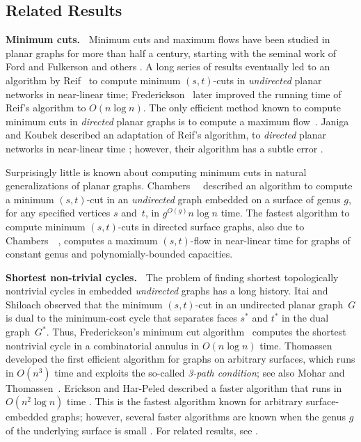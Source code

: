 \documentclass[twoside,leqno,twocolumn]{article}
\def\fakeparagraph#1{\par\medskip\noindent\textbf{#1}}
\begin{document}
\subsection{Related Results}

\textbf{Minimum cuts.~}
Minimum cuts and maximum flows have been studied in planar graphs for more than half a century, starting with the seminal work of Ford and Fulkerson \cite{ff-mfn-56} and others \cite{hr-fmern-55}.  A long series of results eventually led to an algorithm by Reif~\cite{r-mstcp-83} to compute minimum $(s,t)$-cuts in \emph{undirected} planar networks in near-linear time; Frederickson~\cite{f-faspp-87} later improved the running time of Reif's algorithm to $O(n\log n)$.  The only efficient method known to compute minimum cuts in \emph{directed} planar graphs is to compute a maximum flow~\cite{w-mstfp-97, bk-amfdp-09, parshort}.  Janiga and Koubek described an adaptation of Reif's algorithm, to \emph{directed} planar networks in near-linear time \cite{jk-mcdpn-92}; however, their algorithm has a subtle error \cite{n-pc-10}.

Surprisingly little is known about computing minimum cuts in natural generalizations of planar graphs.  Chambers~\etal~\cite{surfcut} described an algorithm to compute a minimum $(s,t)$-cut in an \emph{undirected} graph embedded on a surface of genus $g$, for any specified vertices $s$ and~$t$, in $g^{O(g)}n\log n$ time.  The fastest algorithm to compute minimum $(s,t)$-cuts in  directed surface graphs, also due to Chambers~\etal~\cite{surflow}, computes a maximum $(s,t)$-flow in near-linear time for graphs of constant genus and polynomially-bounded capacities.

\fakeparagraph{Shortest non-trivial cycles.~}
The problem of finding shortest topologically nontrivial cycles in embedded \emph{undirected} graphs has a long history.  Itai and Shiloach \cite{is-mfpn-79} observed that the minimum $(s,t)$-cut in an undirected planar graph~$G$ is dual to the minimum-cost cycle that separates faces $s^*$ and $t^*$ in the dual graph~$G^*$.  Thus, Frederickson's minimum cut algorithm~\cite{f-faspp-87} computes the shortest nontrivial cycle in a combinatorial annulus in $O(n\log n)$ time.  Thomassen \cite{t-egnsn-90} developed the first efficient algorithm for graphs on arbitrary surfaces, which runs in $O(n^3)$ time and exploits the so-called \emph{3-path condition}; see also Mohar and Thomassen~\cite[Sect.~4.3]{mt-gs-01}.  Erickson and Har-Peled described a faster algorithm that runs in $O(n^2 \log n)$ time \cite{schema}.  This is the fastest algorithm known for arbitrary surface-embedded graphs; however, several faster algorithms are known when the genus $g$ of the underlying surface is small \cite{cm-fsnsn-07, c-mdpg-06, k-csnco-06, cc-msspg-07, multishort}.  For related results, see \cite{ccl-osaew-10,tight,splitting,essential}.
\end{document}
